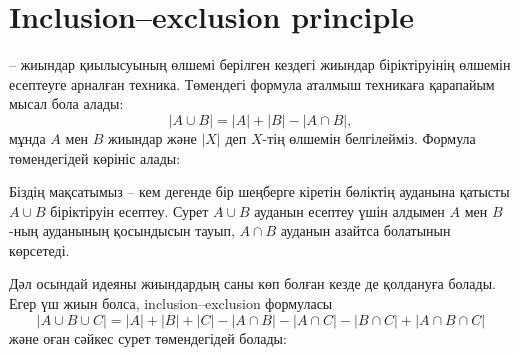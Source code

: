\section{Inclusion–exclusion principle} %



 -- жиындар қиылысуының өлшемі берілген кездегі  
жиындар біріктіруінің өлшемін есептеуге арналған техника. %
Төмендегі формула аталмыш техникаға қарапайым мысал бола алады:
\[ |A \cup B| = |A| + |B| - |A \cap B|,\]
мұнда $A$ мен $B$ жиындар және $|X|$ деп 
$X$-тің өлшемін белгілейміз. 
Формула төмендегідей көрініс алады:


\begin{center}
\end{center}

Біздің мақсатымыз -- кем дегенде бір шеңберге кіретін бөліктің ауданына қатысты $A \cup B$ біріктіруін 
есептеу. 
Сурет $A \cup B$ ауданын есептеу үшін алдымен $A$ мен $B$-ның ауданының
қосындысын тауып, $A \cap B$ ауданын азайтса болатынын көрсетеді.


Дәл осындай идеяны жиындардың саны көп болған кезде де
қолдануға болады.
Егер үш жиын болса, inclusion–exclusion формуласы %
\[ |A \cup B \cup C| = |A| + |B| + |C| - |A \cap B|  - |A \cap C|  - |B \cap C| + |A \cap B \cap C| \]
және оған сәйкес сурет төмендегідей болады:

